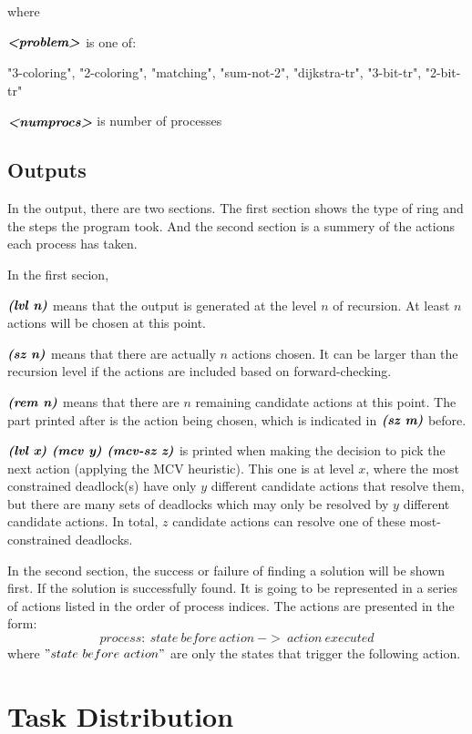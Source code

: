 where

$\textbf{\emph{<problem>}}$ is one of:

"3-coloring", "2-coloring", "matching", "sum-not-2", "dijkstra-tr", "3-bit-tr", "2-bit-tr"

$\textbf{\emph{<numprocs>}}$ is number of processes

\subsection{Outputs}
In the output, there are two sections. The first section shows the type of ring and the steps the program took. And the second section is a summery of the actions each process has taken.

In the first secion,

$\textbf{\emph{(lvl\ n)}}$ means that the output is generated at the level $n$ of recursion. At least $n$ actions will be chosen at this point.

$\textbf{\emph{(sz\ n)}}$ means that there are actually $n$ actions chosen. It can be larger than the recursion level if the actions are included based on forward-checking.

$\textbf{\emph{(rem\ n)}}$ means that there are $n$ remaining candidate actions at this point. The part printed after is the action being chosen, which is indicated in $\textbf{\emph{(sz\ m)}}$ before. 

$\textbf{\emph{(lvl\ x) (mcv\ y) (mcv-sz\ z)}}$ is printed when making the decision to pick the next action (applying the MCV heuristic). This one is at level $x$, where the most constrained deadlock(s) have only $y$ different candidate actions that resolve them, but there are many sets of deadlocks which may only be resolved by $y$ different candidate actions. In total, $z$ candidate actions can resolve one of these most-constrained deadlocks.

In the second section, the success or failure of finding a solution will be shown first. If the solution is successfully found. It is going to be represented in a series of actions listed in the order of process indices. The actions are presented in the form: 
\[
process:\ state\ before\ action\ ->\ action\ executed
\]
where $"state\ before\ action"$ are only the states that trigger the following action. 

\section{Task Distribution}

